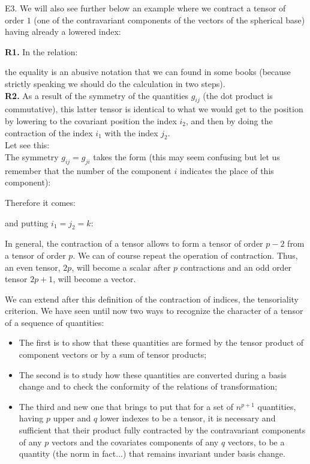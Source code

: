 	\begin{tcolorbox}[colframe=black,colback=white,sharp corners]
	E3. We will also see further below an example where we contract a tensor of order $1$ (one of the contravariant components of the vectors of the spherical base) having already a lowered index:
	
	\end{tcolorbox}
	\begin{tcolorbox}[title=Remarks,colframe=black,arc=10pt]
	\textbf{R1.} In the relation:
	
	the equality is an abusive notation that we can found in some books (because strictly speaking we should do the calculation in two steps).\\
	
	\textbf{R2.} As a result of the symmetry of the quantities $g_{ij}$ (the dot product is commutative), this latter tensor is identical to what we would get to the position by lowering to the covariant position the index $i_2$, and then by doing the contraction of the index $i_1$ with the index $j_2$.\\

	Let see this:\\

	The symmetry $g_{ij}=g_{ji}$ takes the form (this may seem confusing but let us remember that the number of the component $i$ indicates the place of this component):
	
	Therefore it comes:
	
	and putting $i_1=j_2=k$:
	
	\end{tcolorbox}
	In general, the contraction of a tensor allows to form a tensor of order $p-2$ from a tensor of order $p$. We can of course repeat the operation of contraction. Thus, an even tensor, $2p$, will become a scalar after $p$ contractions and an odd order tensor $2p+1$, will become a vector.

	We can extend after this definition of the contraction of indices, the tensoriality criterion. We have seen until now two ways to recognize the character of a tensor of a sequence of quantities:
	\begin{itemize}
		\item The first is to show that these quantities are formed by the tensor product of component vectors or by a sum of tensor products;

		\item The second is to study how these quantities are converted during a basis change and to check the conformity of the relations of transformation;

		\item The third and new one that brings to put that for a set of $n^{p+1}$ quantities, having $p$ upper and $q$ lower indexes to be a tensor, it is necessary and sufficient that their product fully contracted by the contravariant components of any $p$ vectors and the covariates components of any $q$ vectors, to be a quantity (the norm in fact...) that remains invariant under basis change.
	\end{itemize}
	
